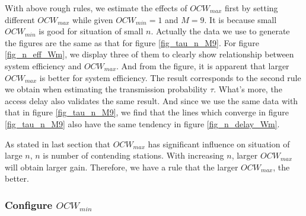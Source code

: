 With above rough rules, we estimate the effects of $OCW_{max}$ first by setting different $OCW_{max}$ while given $OCW_{min}=1$ and $M=9$.
It is because small $OCW_{min}$ is good for situation of small $n$.
Actually the data we use to generate the figures are the same as that for figure \ref{fig_tau_n_M9}. For figure \ref{fig_n_eff_Wm}, we display three of them to clearly show relationship between system efficiency and $OCW_{max}$.
And from the figure, it is apparent that larger $OCW_{max}$ is better for system efficiency. 
The result corresponds to the second rule we obtain when estimating the transmission probability $\tau$.
What's more, the access delay also validates the same result. And since we use the same data with that in figure \ref{fig_tau_n_M9}, we find that the lines which converge in figure \ref{fig_tau_n_M9} also have the same tendency in figure \ref{fig_n_delay_Wm}. 

As stated in last section that $OCW_{max}$ has significant influence on situation of large $n$, $n$ is number of contending stations. With increasing $n$, larger $OCW_{max}$ will obtain larger gain. 
Therefore, we have a rule that the larger $OCW_{max}$, the better.



\subsubsection{Configure $OCW_{min}$}


